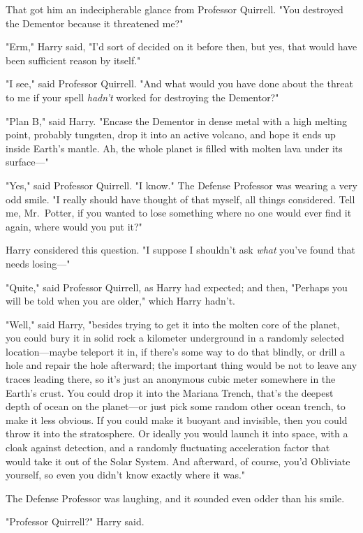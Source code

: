 That got him an indecipherable glance from Professor Quirrell. "You destroyed 
the Dementor because it threatened me?"

"Erm," Harry said, "I'd sort of decided on it before then, but yes, that would 
have been sufficient reason by itself."

"I see," said Professor Quirrell. "And what would you have done about the 
threat to me if your spell \emph{hadn't} worked for destroying the Dementor?"

"Plan B," said Harry. "Encase the Dementor in dense metal with a high melting 
point, probably tungsten, drop it into an active volcano, and hope it ends up 
inside Earth's mantle. Ah, the whole planet is filled with molten lava under 
its surface---"

"Yes," said Professor Quirrell. "I know." The Defense Professor was wearing a 
very odd smile. "I really should have thought of that myself, all things 
considered. Tell me, Mr.~Potter, if you wanted to lose something where no one 
would ever find it again, where would you put it?"

Harry considered this question. "I suppose I shouldn't ask \emph{what} you've 
found that needs losing---"

"Quite," said Professor Quirrell, as Harry had expected; and then, "Perhaps you 
will be told when you are older," which Harry hadn't.

"Well," said Harry, "besides trying to get it into the molten core of the 
planet, you could bury it in solid rock a kilometer underground in a randomly 
selected location---maybe teleport it in, if there's some way to do that 
blindly, or drill a hole and repair the hole afterward; the important thing 
would be not to leave any traces leading there, so it's just an anonymous cubic 
meter somewhere in the Earth's crust. You could drop it into the Mariana 
Trench, that's the deepest depth of ocean on the planet---or just pick some 
random other ocean trench, to make it less obvious. If you could make it 
buoyant and invisible, then you could throw it into the stratosphere. Or 
ideally you would launch it into space, with a cloak against detection, and a 
randomly fluctuating acceleration factor that would take it out of the Solar 
System. And afterward, of course, you'd Obliviate yourself, so even you didn't 
know exactly where it was."

The Defense Professor was laughing, and it sounded even odder than his smile.

"Professor Quirrell?" Harry said.

